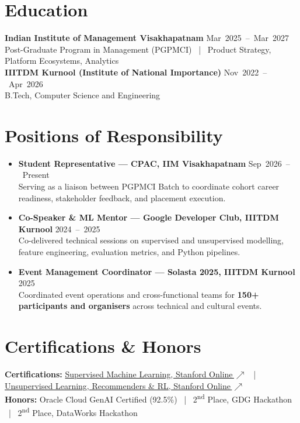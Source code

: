 \documentclass[10pt,a4paper]{article}
\begin{document}
\section*{Education}
{\small
\textbf{Indian Institute of Management Visakhapatnam} \hfill \textcolor{muted}{\mbox{Mar 2025 -- Mar 2027}}\\
Post-Graduate Program in Management (PGPMCI) ~|~ Product Strategy, Platform Ecosystems, Analytics\\[1.5pt]
\textbf{IIITDM Kurnool (Institute of National Importance)} \hfill \textcolor{muted}{\mbox{Nov 2022 -- Apr 2026}}\\
B.Tech, Computer Science and Engineering
}

\section*{Positions of Responsibility}
\begin{itemize}[itemsep=0.8pt]\small
\item \textbf{Student Representative --- CPAC, IIM Visakhapatnam} \hfill \textcolor{muted}{\mbox{Sep 2026 -- Present}}\\
Serving as a liaison between PGPMCI Batch to coordinate cohort career readiness, stakeholder feedback, and placement execution.
\item \textbf{Co-Speaker \& ML Mentor --- Google Developer Club, IIITDM Kurnool} \hfill \textcolor{muted}{\mbox{2024 -- 2025}}\\
Co-delivered technical sessions on supervised and unsupervised modelling, feature engineering, evaluation metrics, and Python pipelines.
\item \textbf{Event Management Coordinator --- Solasta 2025, IIITDM Kurnool} \hfill \textcolor{muted}{\mbox{2025}}\\
Coordinated event operations and cross-functional teams for \textbf{150+ participants and organisers} across technical and cultural events.
\end{itemize}

\section*{Certifications \& Honors}
{\small
\textbf{Certifications:}
\href{https://www.coursera.org/account/accomplishments/verify/YT9Z5U2YJAJX}{Supervised Machine Learning, Stanford Online\,$\nearrow$} ~|~ 
\href{https://www.coursera.org/account/accomplishments/verify/3X1M09A4GTGI}{Unsupervised Learning, Recommenders \& RL, Stanford Online\,$\nearrow$}\\[0.5pt]
\textbf{Honors:}
Oracle Cloud GenAI Certified (92.5\%) ~|~ 
2\textsuperscript{nd} Place, GDG Hackathon ~|~ 
2\textsuperscript{nd} Place, DataWorks Hackathon
}
\end{document}
